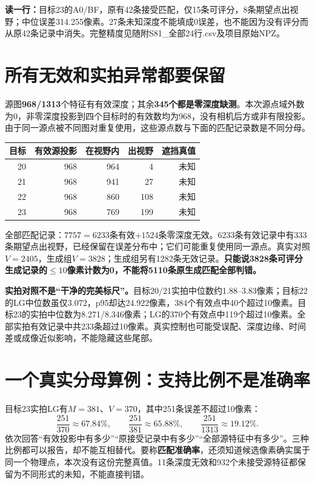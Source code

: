 \documentclass[UTF8,11pt,a4paper]{ctexart}
\begin{document}
\textbf{读一行：}目标23的A0/BF，原有42条接受匹配，仅15条可评分，8条期望点出视野；中位误差314.255像素。27条未知深度不能填成0误差，也不能因为没有评分而从原42条记录中消失。完整精度见随附S81\_全部24行.csv及项目原始NPZ。
\clearpage
\section{ 所有无效和实拍异常都要保留}
源图\textbf{968/1313}个特征有有效深度；其余\textbf{345个都是零深度缺测}。本次源点域外数为0，非零深度投影到四个目标时的有效数均为968，没有相机后方或非有限投影。由于同一源点被不同图对重复使用，这些源点数与下面的匹配记录数是不同分母。

\begin{center}
\begin{tabular}{rrrrr}\toprule
目标 & 有效源投影 & 在视野内 & 出视野 & 遮挡真值\\\midrule
20&968&964&4&未知\\21&968&941&27&未知\\22&968&860&108&未知\\23&968&769&199&未知\\\bottomrule
\end{tabular}\end{center}
全部匹配记录：$7757=6233$条有效$+1524$条零深度无效。6233条有效记录中有333条期望点出视野，已经保留在误差分布中；它们可能重复使用同一源点。真实对照$V=2405$，生成组$V=3828$；生成组另有1282条无效记录。\textbf{只能说3828条可评分生成记录的$\le10$像素计数为0，不能将5110条原生成匹配全部判错。}

\textbf{实拍对照不是“干净的完美标尺”。}目标20/21实拍中位数约1.88--3.83像素；目标22的LG中位数虽仅3.072，p95却达24.922像素，384个有效点中40个超过10像素。目标23的实拍中位数为8.271/8.346像素；LG的370个有效点中119个超过10像素。全部实拍有效记录中共233条超过10像素。真实控制也可能受误配、深度边缘、时间差或成像近似影响，不能隐藏这些尾部。

\section{ 一个真实分母算例：支持比例不是准确率}
目标23实拍LG有$M=381$、$V=370$，其中251条误差不超过10像素：
\[
\frac{251}{370}\approx67.84\%,\qquad
\frac{251}{381}\approx65.88\%,\qquad
\frac{251}{1313}\approx19.12\%.
\]
依次回答“有效投影中有多少”“原接受记录中有多少”“全部源特征中有多少”。三种比例都可以报告，却不能互相替代。要称\textbf{匹配准确率}，还须知道候选像素确实属于同一个物理点，本次没有这份完整真值。11条深度无效和932个未接受源特征都保留为不同形式的未知，不能直接判错。
\end{document}
